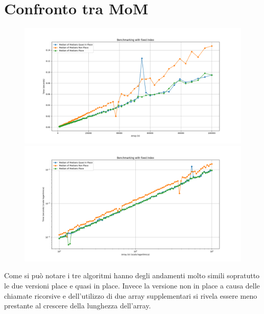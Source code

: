 \documentclass[a4paper]{article}
\begin{document}
\section{Confronto tra MoM}
\label{sec:confronto-mom}
\begin{figure}[h]
    \centering
    \includegraphics[width=.83\textwidth]{graphs/MoMs_n.png}
    \includegraphics[width=.83\textwidth]{graphs/MoMs_2xlog.png}
\end{figure}
Come si può notare i tre algoritmi hanno degli andamenti molto simili sopratutto le due versioni place e quasi in place. Invece la versione non in place a causa delle chiamate ricorsive e dell'utilizzo di due array supplementari si rivela essere meno prestante al crescere della lunghezza dell'array.\\
\end{document}
